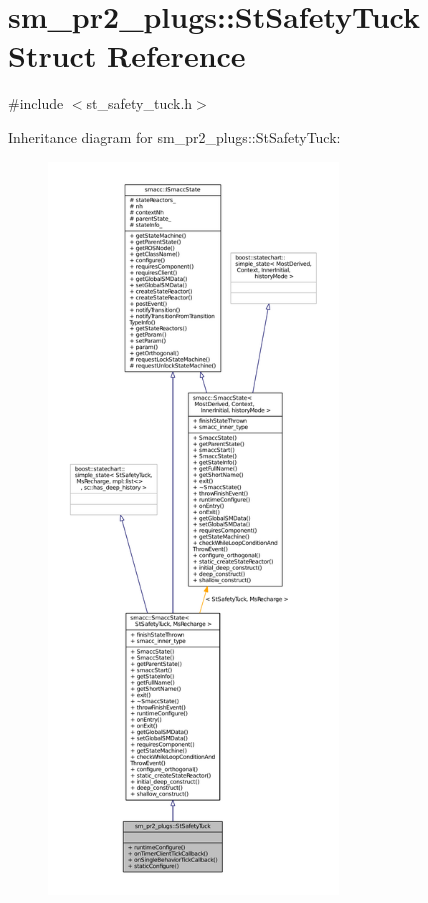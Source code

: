 \hypertarget{structsm__pr2__plugs_1_1StSafetyTuck}{}\section{sm\+\_\+pr2\+\_\+plugs\+:\+:St\+Safety\+Tuck Struct Reference}
\label{structsm__pr2__plugs_1_1StSafetyTuck}


{\ttfamily \#include $<$st\+\_\+safety\+\_\+tuck.\+h$>$}



Inheritance diagram for sm\+\_\+pr2\+\_\+plugs\+:\+:St\+Safety\+Tuck\+:
\nopagebreak
\begin{figure}[H]
\begin{center}
\leavevmode
\includegraphics[height=550pt]{structsm__pr2__plugs_1_1StSafetyTuck__inherit__graph}
\end{center}
\end{figure}


